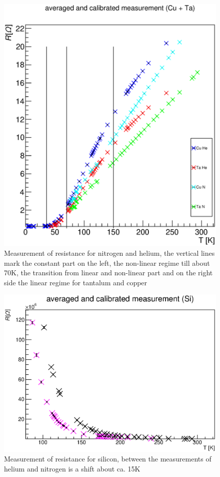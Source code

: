 \documentclass{article}
\begin{document}
\begin{figure}[H]
    \centering
    \includegraphics[width=\textwidth]{Graphen/Cu_Ta.eps}
    \caption{Measurement of resistance for nitrogen and helium, the vertical lines mark the constant part on the left, the non-linear regime till about 70K, the transition from linear and non-linear part and on the right side the linear regime for tantalum and copper}
    \label{semi_raw_TaCu}
\end{figure}
\begin{figure}[H]
    \centering
    \includegraphics[width=\textwidth]{Graphen/Si.eps}
    \caption{Measurement of resistance for silicon, between the measurements of helium and nitrogen is a shift about ca. 15K}
    \label{semi_raw_Si}
\end{figure}
\end{document}
